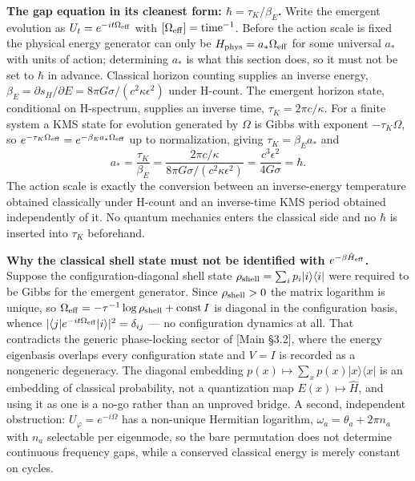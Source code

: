 \documentclass[
]{article}
\begin{document}
\textbf{The gap equation in its cleanest form:
\(\hbar=\tau_K/\beta_E\).} Write the emergent evolution as
\(U_t=e^{-it\Omega_{\rm eff}}\) with
\([\Omega_{\rm eff}]=\text{time}^{-1}\). Before the action scale is
fixed the physical energy generator can only be
\(H_{\rm phys}=a_*\Omega_{\rm eff}\) for some universal \(a_*\) with
units of action; determining \(a_*\) is what this section does, so it
must not be set to \(\hbar\) in advance. Classical horizon counting
supplies an inverse energy,
\(\beta_E=\partial s_H/\partial E=8\pi G\sigma/(c^2\kappa\epsilon^2)\)
under H-count. The emergent horizon state, conditional on H-spectrum,
supplies an inverse time, \(\tau_K=2\pi c/\kappa\). For a finite system
a KMS state for evolution generated by \(\Omega\) is Gibbs with exponent
\(-\tau_K\Omega\), so
\(e^{-\tau_K\Omega_{\rm eff}}=e^{-\beta_Ea_*\Omega_{\rm eff}}\) up to
normalization, giving \(\tau_K=\beta_Ea_*\) and \[
 a_*=\frac{\tau_K}{\beta_E}=\frac{2\pi c/\kappa}{8\pi G\sigma/(c^2\kappa\epsilon^2)}=\frac{c^3\epsilon^2}{4G\sigma}=\hbar .
\] The action scale is exactly the conversion between an inverse-energy
temperature obtained classically under H-count and an inverse-time KMS
period obtained independently of it. No quantum mechanics enters the
classical side and no \(\hbar\) is inserted into \(\tau_K\) beforehand.

\textbf{Why the classical shell state must not be identified with
\(e^{-\beta\hat H_{\rm eff}}\).} Suppose the configuration-diagonal
shell state \(\rho_{\rm shell}=\sum_ip_i|i\rangle\langle i|\) were
required to be Gibbs for the emergent generator. Since
\(\rho_{\rm shell}>0\) the matrix logarithm is unique, so
\(\Omega_{\rm eff}=-\tau^{-1}\log\rho_{\rm shell}+\text{const}\,I\) is
diagonal in the configuration basis, whence
\(|\langle j|e^{-it\Omega_{\rm eff}}|i\rangle|^2=\delta_{ij}\) --- no
configuration dynamics at all. That contradicts the generic
phase-locking sector of {[}Main §3.2{]}, where the energy eigenbasis
overlaps every configuration state and \(V=I\) is recorded as a
nongeneric degeneracy. The diagonal embedding
\(p(x)\mapsto\sum_xp(x)|x\rangle\langle x|\) is an embedding of
classical probability, not a quantization map \(E(x)\mapsto\hat H\), and
using it as one is a no-go rather than an unproved bridge. A second,
independent obstruction: \(U_\varphi=e^{-i\Omega}\) has a non-unique
Hermitian logarithm, \(\omega_a=\theta_a+2\pi n_a\) with \(n_a\)
selectable per eigenmode, so the bare permutation does not determine
continuous frequency gaps, while a conserved classical energy is merely
constant on cycles.
\end{document}
